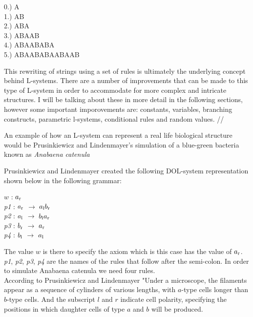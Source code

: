 \begin{flushleft}
\vspace{5mm}

0.) A \\
1.) AB \\
2.) ABA \\
3.) ABAAB \\
4.) ABAABABA \\
5.) ABAABABAABAAB \\

\vspace{5mm}

This rewriting of strings using a set of rules is ultimately the underlying concept behind L-systems. There are a number of improvements that can be made to this type of L-system in order to accommodate for more complex and intricate structures. I will be talking about these in more detail in the following sections, however some important imporovements are: constants, variables, branching constructs, parametric l-systems, conditional rules and random values. //

\vspace{5mm}

An example of how an L-system can represent a real life biological structure would be Prusinkiewicz and Lindenmayer's simulation of a blue-green bacteria known as \textit{Anabaena catenula}\\

\vspace{5mm}

Prusinkiewicz and Lindenmayer created the following DOL-system representation shown below in the following grammar: \\

\vspace{5mm}

$w$ : $ a\textsubscript{r} $\\
\textit{p1} : $ a\textsubscript{r} $ $\rightarrow$ $a\textsubscript{l}b\textsubscript{r}$ \\
\textit{p2} : $ a\textsubscript{l} $ $\rightarrow$ $b\textsubscript{l}a\textsubscript{r}$ \\
\textit{p3} : $ b\textsubscript{r} $ $\rightarrow$ $a\textsubscript{r}$ \\
\textit{p4} : $ b\textsubscript{l} $ $\rightarrow$ $a\textsubscript{l}$ \\

\vspace{5mm}

The value $w$ is there to specify the axiom which is this case has the value of $ a\textsubscript{r} $. \textit{p1}, \textit{p2}, \textit{p3}, \textit{p4} are the names of the rules that follow after the semi-colon. In order to simulate Anabaena catenula we need four rules. \\
According to Prusinkiewicz and Lindenmayer "Under a microscope, the filaments appear as a sequence of cylinders of various lengths, with $a$-type cells longer than $b$-type cells. And the subscript $l$ and $r$ indicate cell polarity, specifying the positions in which daughter cells of type $a$ and $b$ will be produced. \cite{prusinkiewicz2012algorithmic} \\


\end{flushleft}
